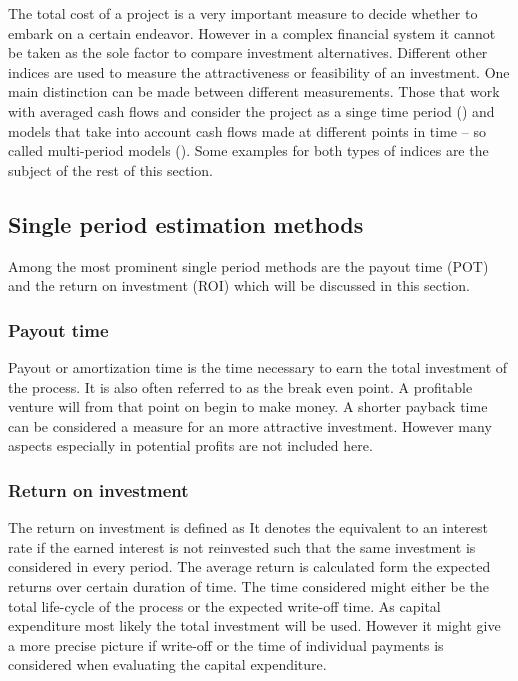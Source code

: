     The total cost of a project is a very important measure to decide whether to embark on a certain endeavor.
    However in a complex financial system it cannot be taken as the sole factor to compare investment
    alternatives. Different other indices are used to measure the attractiveness or feasibility of an investment. One
    main distinction can be made between different measurements. Those that work with averaged cash flows
    and consider the project as a singe time period () and models that take into
    account cash flows made at different points in time -- so called multi-period models ().
    Some examples for both types of indices are the subject of the rest of this section.


    \subsection{Single period estimation methods}
    \label{sec:SinglePeriod}
        Among the most prominent single period methods are the payout time (POT) and the return on
        investment (ROI) which will be discussed in this section.

        \subsubsection{Payout time}
            Payout or amortization  time is the time necessary to earn the total investment of the process. It is also
            often referred to as the break even point. A profitable venture will from that point on begin to make money.
            A shorter payback time can be considered a measure for an more attractive investment.
            However many aspects especially in potential profits are not included here.

        \subsubsection{Return on investment}
            The return on investment is defined as
            It denotes the equivalent to an interest rate if the earned interest is not reinvested such that the same
            investment is considered in every period. The average return is calculated form the expected returns
            over certain duration of time. The time considered might either be the total life-cycle of the process or
            the expected write-off time. As capital expenditure most likely the total investment will be used. However
            it might give a more precise picture if write-off or the time of individual payments is considered when
            evaluating the capital expenditure.

